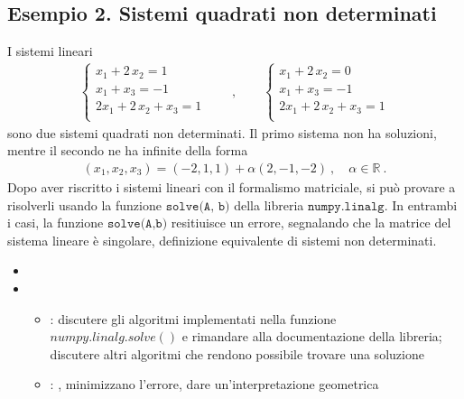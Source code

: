 \documentclass[letterpaper,10pt,italian]{jupyterBook}
\begin{document}
\subsection{Esempio 2. Sistemi quadrati non determinati}
\label{\detokenize{ch/numerics/linear:esempio-2-sistemi-quadrati-non-determinati}}
\sphinxAtStartPar
I sistemi lineari
\begin{equation*}
\begin{split}\begin{cases}
  x_1 + 2 \, x_2 = 1 \\
  x_1 + x_3 = -1 \\
  2 x_1 + 2 \, x_2 + x_3 = 1 \\
\end{cases}
\qquad , \qquad
\begin{cases}
  x_1 + 2 \, x_2 = 0 \\
  x_1 + x_3 = -1 \\
  2 x_1 + 2 \, x_2 + x_3 = 1 \\
\end{cases}\end{split}
\end{equation*}
\sphinxAtStartPar
sono due sistemi quadrati non determinati. Il primo sistema non ha soluzioni, mentre il secondo ne ha infinite della forma
\begin{equation*}
\begin{split}(x_1, x_2, x_3) = (-2, 1, 1) + \alpha (2, -1, -2) \ , \quad \alpha \in \mathbb{R} \ .\end{split}
\end{equation*}
\sphinxAtStartPar
Dopo aver riscritto i sistemi lineari con il formalismo matriciale, si può provare a risolverli usando la funzione \(\texttt{solve(A, b)}\) della libreria \(\texttt{numpy.linalg}\). In entrambi i casi, la funzione \(\texttt{solve(A,b)}\) resitiuisce un errore, segnalando che la matrice del sistema lineare è singolare, definizione equivalente di sistemi non determinati.
\begin{itemize}
\item {} 
\sphinxAtStartPar
{} 

\item {} 
\sphinxAtStartPar
{} 
\begin{itemize}
\item {} 
\sphinxAtStartPar
{}: discutere gli algoritmi implementati nella funzione \(numpy.linalg.solve()\) e rimandare alla documentazione della libreria; discutere altri algoritmi che rendono possibile trovare una soluzione

\item {} 
\sphinxAtStartPar
{}: , minimizzano l’errore, dare un’interpretazione geometrica

\end{itemize}

\end{itemize}
\end{document}
